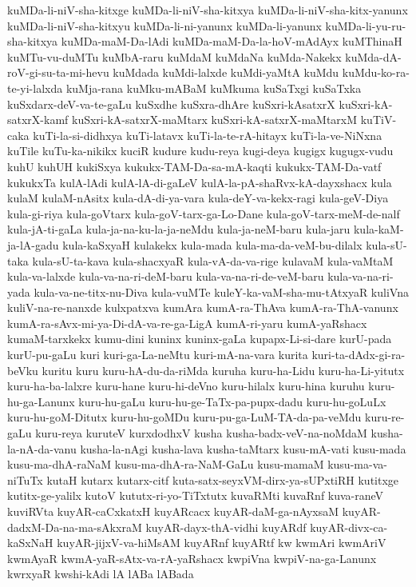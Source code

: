 {kuMDa-li-niV-sha-kitxge
kuMDa-li-niV-sha-kitxya
kuMDa-li-niV-sha-kitx-yanunx
kuMDa-li-niV-sha-kitxyu
kuMDa-li-ni-yanunx
kuMDa-li-yanunx
kuMDa-li-yu-ru-sha-kitxya
kuMDa-maM-Da-lAdi
kuMDa-maM-Da-la-hoV-mAdAyx
kuMThinaH
kuMTu-vu-duMTu
kuMbA-raru
kuMdaM
kuMdaNa
kuMda-Nakekx
kuMda-dA-roV-gi-su-ta-mi-hevu
kuMdada
kuMdi-lalxde
kuMdi-yaMtA
kuMdu
kuMdu-ko-ra-te-yi-lalxda
kuMja-rana
kuMku-mABaM
kuMkuma
kuSaTxgi
kuSaTxka
kuSxdarx-deV-va-te-gaLu
kuSxdhe
kuSxra-dhAre
kuSxri-kAsatxrX
kuSxri-kA-satxrX-kamf
kuSxri-kA-satxrX-maMtarx
kuSxri-kA-satxrX-maMtarxM
kuTiV-caka
kuTi-la-si-didhxya
kuTi-latavx
kuTi-la-te-rA-hitayx
kuTi-la-ve-NiNxna
kuTile
kuTu-ka-nikikx
kuciR
kudure
kudu-reya
kugi-deya
kugigx
kugugx-vudu
kuhU
kuhUH
kukiSxya
kukukx-TAM-Da-sa-mA-kaqti
kukukx-TAM-Da-vatf
kukukxTa
kulA-lAdi
kulA-lA-di-gaLeV
kulA-la-pA-shaRvx-kA-dayxshacx
kula
kulaM
kulaM-nAsitx
kula-dA-di-ya-vara
kula-deY-va-kekx-ragi
kula-geV-Diya
kula-gi-riya
kula-goVtarx
kula-goV-tarx-ga-Lo-Dane
kula-goV-tarx-meM-de-nalf
kula-jA-ti-gaLa
kula-ja-na-ku-la-ja-neMdu
kula-ja-neM-baru
kula-jaru
kula-kaM-ja-lA-gadu
kula-kaSxyaH
kulakekx
kula-mada
kula-ma-da-veM-bu-dilalx
kula-sU-taka
kula-sU-ta-kava
kula-shacxyaR
kula-vA-da-va-rige
kulavaM
kula-vaMtaM
kula-va-lalxde
kula-va-na-ri-deM-baru
kula-va-na-ri-de-veM-baru
kula-va-na-ri-yada
kula-va-ne-titx-nu-Diva
kula-vuMTe
kuleY-ka-vaM-sha-mu-tAtxyaR
kuliVna
kuliV-na-re-nanxde
kulxpatxva
kumAra
kumA-ra-ThAva
kumA-ra-ThA-vanunx
kumA-ra-sAvx-mi-ya-Di-dA-va-re-ga-LigA
kumA-ri-yaru
kumA-yaRshacx
kumaM-tarxkekx
kumu-dini
kuninx
kuninx-gaLa
kupapx-Li-si-dare
kurU-pada
kurU-pu-gaLu
kuri
kuri-ga-La-neMtu
kuri-mA-na-vara
kurita
kuri-ta-dAdx-gi-ra-beVku
kuritu
kuru
kuru-hA-du-da-riMda
kuruha
kuru-ha-Lidu
kuru-ha-Li-yitutx
kuru-ha-ba-lalxre
kuru-hane
kuru-hi-deVno
kuru-hilalx
kuru-hina
kuruhu
kuru-hu-ga-Lanunx
kuru-hu-gaLu
kuru-hu-ge-TaTx-pa-pupx-dadu
kuru-hu-goLuLx
kuru-hu-goM-Ditutx
kuru-hu-goMDu
kuru-pu-ga-LuM-TA-da-pa-veMdu
kuru-re-gaLu
kuru-reya
kuruteV
kurxdodhxV
kusha
kusha-badx-veV-na-noMdaM
kusha-la-nA-da-vanu
kusha-la-nAgi
kusha-lava
kusha-taMtarx
kusu-mA-vati
kusu-mada
kusu-ma-dhA-raNaM
kusu-ma-dhA-ra-NaM-GaLu
kusu-mamaM
kusu-ma-va-niTuTx
kutaH
kutarx
kutarx-citf
kuta-satx-seyxVM-dirx-ya-sUPxtiRH
kutitxge
kutitx-ge-yalilx
kutoV
kututx-ri-yo-TiTxtutx
kuvaRMti
kuvaRnf
kuva-raneV
kuviRVta
kuyAR-caCxkatxH
kuyARcacx
kuyAR-daM-ga-nAyxsaM
kuyAR-dadxM-Da-na-ma-sAkxraM
kuyAR-dayx-thA-vidhi
kuyARdf
kuyAR-divx-ca-kaSxNaH
kuyAR-jijxV-va-hiMsAM
kuyARnf
kuyARtf
kw
kwmAri
kwmAriV
kwmAyaR
kwmA-yaR-sAtx-va-rA-yaRshacx
kwpiVna
kwpiV-na-ga-Lanunx
kwrxyaR
kwshi-kAdi
lA
lABa
lABada
}
